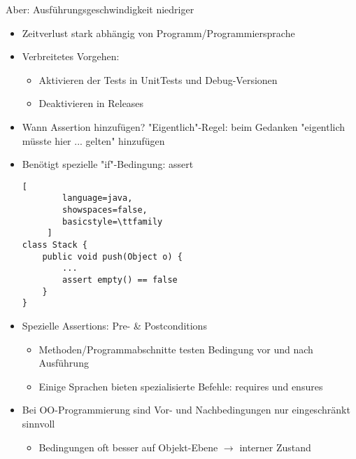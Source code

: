 \documentclass[10pt]{article}
\begin{document}
Aber: Ausführungsgeschwindigkeit niedriger
\begin{itemize}
  \item Zeitverlust stark abhängig von Programm/Programmiersprache
  \item Verbreitetes Vorgehen:
        \begin{itemize}
          \item Aktivieren der Tests in UnitTests und Debug-Versionen
          \item Deaktivieren in Releases
        \end{itemize}
  \item Wann Assertion hinzufügen? "Eigentlich"-Regel: beim Gedanken "eigentlich müsste hier ... gelten" hinzufügen
  \item Benötigt spezielle "if"-Bedingung: assert
        \begin{lstlisting}[
        language=java,
        showspaces=false,
        basicstyle=\ttfamily
     ]
class Stack {
    public void push(Object o) {
        ...
        assert empty() == false
    }
}
\end{lstlisting}
  \item Spezielle Assertions: Pre- \& Postconditions
        \begin{itemize}
          \item Methoden/Programmabschnitte testen Bedingung vor und nach Ausführung
          \item Einige Sprachen bieten spezialisierte Befehle: requires und ensures
        \end{itemize}
  \item Bei OO-Programmierung sind Vor- und Nachbedingungen nur eingeschränkt sinnvoll
        \begin{itemize}
          \item Bedingungen oft besser auf Objekt-Ebene $\rightarrow$ interner Zustand
        \end{itemize}
\end{itemize}
\end{document}
